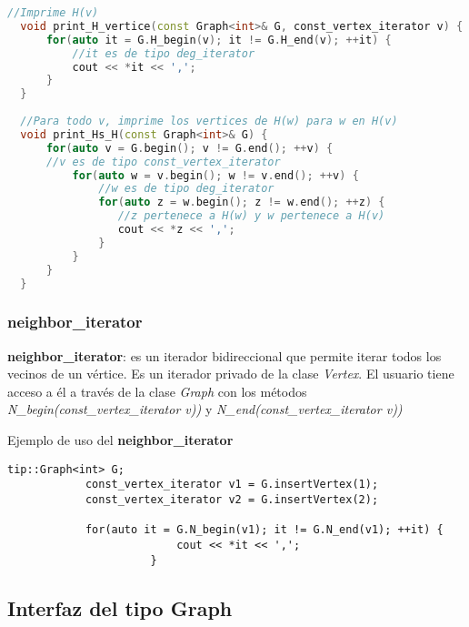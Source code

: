 \documentclass[%
    a4paper,%
    12pt,%
    twoside,%
    openright,%
    halfparskip,%
    cleardoubleempty,%
    bigheadings,%
    titlepage,%
    headsepline%
]{scrbook}
\makeatletter
\newcommand{\Code}[1]{\lstinline[basicstyle={\tt}]@#1@}
\makeatother
\begin{document}
\begin{lstlisting}[caption={Ejemplo de uso de \Code{deg_iterator}.  En el ejemplo, se accede a $H(v)$ para un vértice $v$ invocando \Code{H_begin} usando el grafo, usando directamente un \textbf{const\_vertex\_iterator} y usando un \textbf{deg\_iterator}.},name=deg_iterator,gobble=2,float=ht,label={lst:c++:const_vertex_iterator},language=C++]
  //Imprime H(v)
  void print_H_vertice(const Graph<int>& G, const_vertex_iterator v) {
      for(auto it = G.H_begin(v); it != G.H_end(v); ++it) {
          //it es de tipo deg_iterator
          cout << *it << ',';
      }
  }
  
  //Para todo v, imprime los vertices de H(w) para w en H(v)
  void print_Hs_H(const Graph<int>& G) {
      for(auto v = G.begin(); v != G.end(); ++v) {
      //v es de tipo const_vertex_iterator
          for(auto w = v.begin(); w != v.end(); ++v) {
              //w es de tipo deg_iterator
              for(auto z = w.begin(); z != w.end(); ++z) {
                 //z pertenece a H(w) y w pertenece a H(v)
                 cout << *z << ',';
              }
          }
      }
  }
\end{lstlisting}

\subsubsection{neighbor\_iterator}
\label{sec:neighbor iterator}
\textbf{neighbor\_iterator}: es un iterador bidireccional que permite iterar todos los vecinos de un vértice. Es un iterador privado de la clase \textit{Vertex}. El usuario tiene acceso a él a través de la clase \textit{Graph} con los métodos \textit{N\_begin(const\_vertex\_iterator v))} y \textit{N\_end(const\_vertex\_iterator v))}

                        Ejemplo de uso del \textbf{neighbor\_iterator}
\textit{}
            \begin{lstlisting}[frame=single]
            tip::Graph<int> G;
            const_vertex_iterator v1 = G.insertVertex(1);
            const_vertex_iterator v2 = G.insertVertex(2);

            for(auto it = G.N_begin(v1); it != G.N_end(v1); ++it) {
                          cout << *it << ',';
                      }
            \end{lstlisting}

\subsection{Interfaz del tipo Graph}
\end{document}
